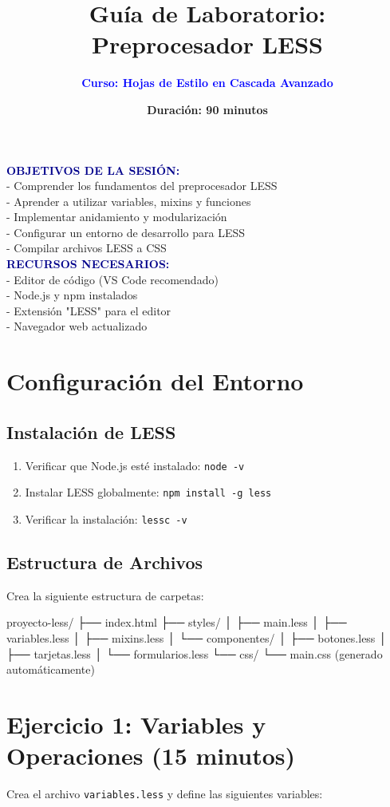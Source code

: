 \documentclass[12pt, a4paper]{article}
\title{\textbf{Guía de Laboratorio: \\ Preprocesador LESS}}
\author{\textcolor{blue}{\textbf{Curso: Hojas de Estilo en Cascada Avanzado}}}
\date{\textbf{Duración: 90 minutos}}
\newcommand{\ejercicio}[2]{
    \section*{Ejercicio #1: #2}
    \vspace{0.3em}
}
\newcommand{\instrucciones}{
    \noindent\colorbox{blue!10}{
        \parbox{\dimexpr\textwidth-2\fboxsep}{
            \textbf{\textcolor{darkblue}{OBJETIVOS DE LA SESIÓN:}} \\
            - Comprender los fundamentos del preprocesador LESS \\
            - Aprender a utilizar variables, mixins y funciones \\
            - Implementar anidamiento y modularización \\
            - Configurar un entorno de desarrollo para LESS \\
            - Compilar archivos LESS a CSS \\
            \vspace{0.5em}
            \textbf{\textcolor{darkblue}{RECURSOS NECESARIOS:}} \\
            - Editor de código (VS Code recomendado) \\
            - Node.js y npm instalados \\
            - Extensión "LESS" para el editor \\
            - Navegador web actualizado
        }
    }
    \vspace{1em}
}
\begin{document}
\maketitle

\instrucciones

\section*{Configuración del Entorno}

\subsection*{Instalación de LESS}
\begin{enumerate}
    \item Verificar que Node.js esté instalado: \texttt{node -v}
    \item Instalar LESS globalmente: \texttt{npm install -g less}
    \item Verificar la instalación: \texttt{lessc -v}
\end{enumerate}

\subsection*{Estructura de Archivos}
Crea la siguiente estructura de carpetas:
\begin{codebox}[title=Estructura de directorios]
proyecto-less/
├── index.html
├── styles/
│   ├── main.less
│   ├── variables.less
│   ├── mixins.less
│   └── componentes/
│       ├── botones.less
│       ├── tarjetas.less
│       └── formularios.less
└── css/
    └── main.css (generado automáticamente)
\end{codebox}

\ejercicio{1}{Variables y Operaciones (15 minutos)}

Crea el archivo \texttt{variables.less} y define las siguientes variables:

\end{document}
